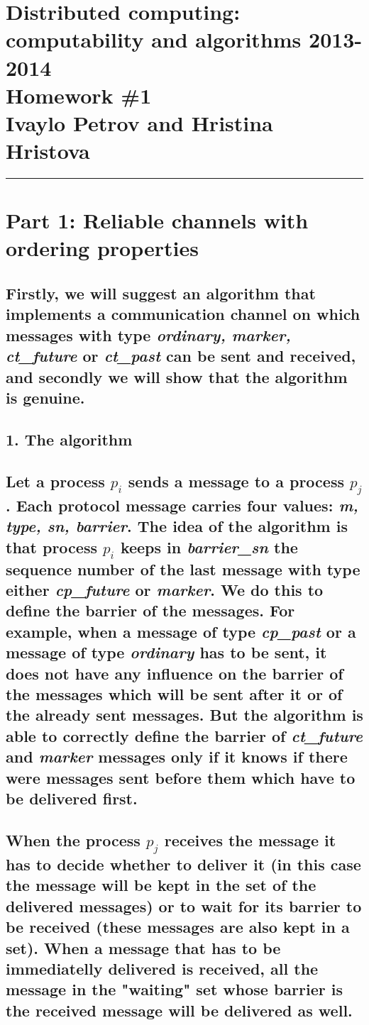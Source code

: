 \documentclass[12pt]{article}
\newcommand{\hr}{\rule{\linewidth}{0.1mm}}
\theoremstyle{plain}
\begin{document}
\section*{\centering
  Distributed computing: computability and algorithms 2013-2014 \\
  Homework \#1 \\
  Ivaylo Petrov and Hristina Hristova 
}

\hr

\section*{\textbf{Part 1: Reliable channels with ordering properties}
}

\subsection*{
  Firstly, we will suggest an algorithm that implements a communication channel 
  on which messages with type \emph{ordinary, marker, ct\_future} or 
  \emph{ct\_past} can be sent and received, and secondly we will show that the
  algorithm is genuine.
}

\subsection*{1. The algorithm}

\subsection*{
  Let a process $p_i$ sends a message to a process $p_j$. Each protocol message
  carries four values: \emph{m, type, sn, barrier}. The idea of the algorithm
  is that process $p_i$ keeps in \emph{barrier\_sn} the sequence number of the
  last message with type either \emph{cp\_future} or \emph{marker}. We do this
  to define the barrier of the messages. For example, when a message of type 
  \emph{cp\_past} or a message of type \emph{ordinary} has to be sent, it does
  not have any influence on the barrier of the messages which will be sent
  after it or of the already sent messages. But the algorithm is able to
  correctly define the barrier of \emph{ct\_future} and \emph{marker} messages
  only if it knows if there were messages sent before them which have to be
  delivered first.
}

\subsection*{
  When the process $p_j$ receives the message it has to decide whether to
  deliver it (in this case the message will be kept in the set of the delivered
  messages) or to wait for its barrier to be received (these messages are also
  kept in a set). When a message that has to be immediatelly delivered is
  received, all the message in the "waiting" set whose barrier is the received
  message will be delivered as well.
}
\end{document}
